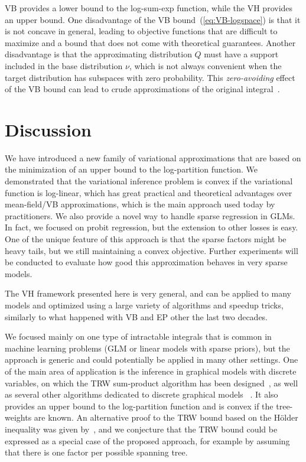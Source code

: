 \documentclass{article} %
\newcommand{\Holder}{H\"older\xspace}
\begin{document}
VB provides a lower bound to the log-sum-exp function, while the VH provides an upper bound. One disadvantage
 of the VB bound~(\ref{eq:VB-logspace}) is that it is not concave in general, 
leading to objective functions that are difficult to maximize and a bound that
does not come with theoretical guarantees. Another disadvantage is that the approximating
distribution $Q$ must have a support included in the base distribution $\nu$, which is not 
always convenient when the target distribution has subspaces with zero probability. 
This \emph{zero-avoiding} effect of the VB bound can lead to 
crude approximations of the original integral~\citep{minka2005divergence}.



\section{Discussion}
We have introduced a new family of variational approximations that are based on the 
minimization of an upper bound to the log-partition function. We demonstrated that
the variational inference problem is convex if the variational function is log-linear, 
which has great practical and theoretical advantages over mean-field/VB approximations,
which is the main approach used today by practitioners. We also provide a novel way to
handle sparse regression in GLMs. In fact, we focused on probit regression, but the extension to
other losses is easy. One of the unique feature of this approach is that
the sparse factors might be heavy tails, but we still maintaining
a convex objective. Further experiments will be conducted to evaluate how good this 
approximation behaves in very sparse models. 

The VH framework presented here is very general, and can be applied to many models and
optimized using a large variety of algorithms and speedup tricks, similarly to what happened 
with VB and EP other the last two decades. 

We focused mainly on one type of intractable integrals that is common in machine learning 
problems (GLM or linear models with sparse priors), but the approach is generic and
could potentially be applied in many other settings. One of the main area of application
is the inference in graphical models with discrete variables, on which the TRW sum-product
algorithm has been designed~\citep{wainwright2005new}, as well as several other
algorithms dedicated to discrete graphical models~ \citep{liu11d}. It also provides an upper bound to the log-partition function
and is convex if the tree-weights are known. An alternative proof to the TRW bound based on the \Holder inequality
was given by~\citet{minka2005divergence}, and we conjecture that the TRW bound could be 
expressed as a special case of the proposed approach, for example by assuming that there is 
one factor per possible spanning tree.
\end{document}
